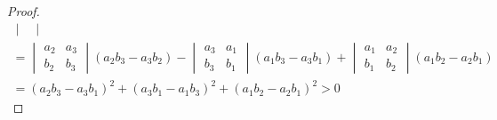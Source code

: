 \begin{proof}
\begin{gather*}
\begin{vmatrix}
        \end{vmatrix} \\
        = \begin{vmatrix}
            a_2 & a_3 \\
            b_2 & b_3
        \end{vmatrix}
        \left(a_2b_3-a_3b_2\right) -
        \begin{vmatrix}
            a_3 & a_1 \\
            b_3 & b_1
        \end{vmatrix}
        \left(a_1b_3-a_3b_1\right) +
        \begin{vmatrix}
            a_1 & a_2 \\
            b_1 & b_2
        \end{vmatrix}
        \left(a_1b_2-a_2b_1\right)\\
        =(a_2 b_3 - a_3 b_1)^2 + (a_3 b_1 - a_1 b_3)^2 + (a_1b_2 - a_2 b_1)^2 >0
    \end{gather*}
\end{proof}
